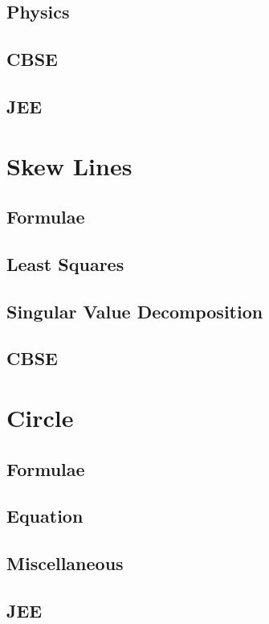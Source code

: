 \documentclass[journal]{IEEEtran}
\begin{document}
\subsection{Physics}

\subsection{CBSE}

\subsection{JEE}

\newpage
\section{Skew Lines}
\subsection{Formulae}

\subsection{Least Squares}

\subsection{Singular Value Decomposition}

\subsection{CBSE}

\newpage
\section{Circle}
\subsection{Formulae}

\subsection{Equation}

\subsection{Miscellaneous}

\subsection{JEE}

\newpage
\end{document}
